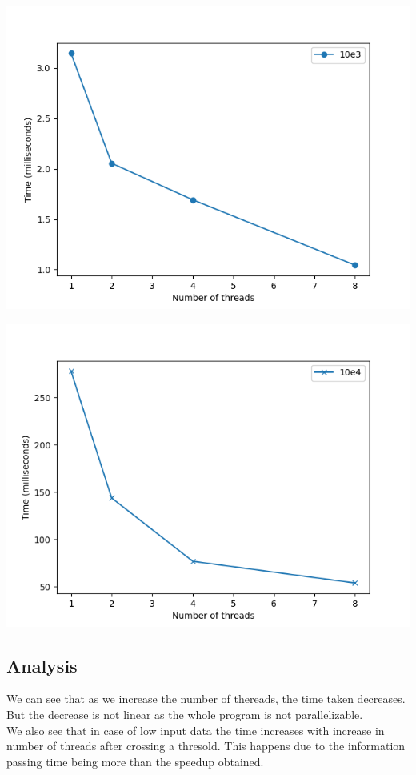 \documentclass[12pt, letterpaper]{article}
\begin{document}
\includegraphics{2}

\includegraphics{1}

\subsection{Analysis}
\label{sec:analysis}

We can see that as we increase the number of thereads, the time taken decreases. But the decrease is not linear as the whole program is not parallelizable.\\

We also see that in case of low input data the time increases with increase in number of threads after crossing a thresold. This happens due to the information passing time being more than the speedup obtained.
\end{document}
